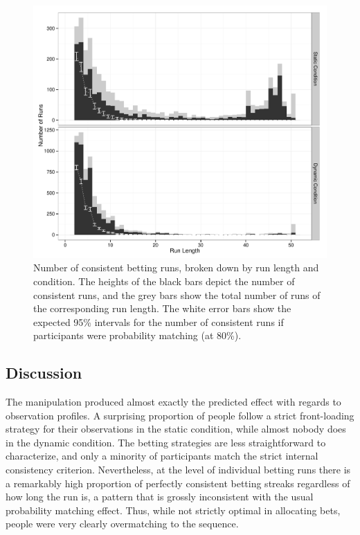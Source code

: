 \documentclass[authoryear]{elsarticle}
\newcommand{\subsectionX}[1]{\subsection{#1}}
\begin{document}
\begin{figure}[t]
\begin{center}
\includegraphics[scale=.6]{overMatching.pdf}
\caption{Number of consistent betting runs, broken down by run length and condition. The heights of the black bars depict the number of consistent runs, and the grey bars show the total number of runs of the corresponding run length. The white error bars show the expected 95\% intervals for the number of consistent runs if participants were probability matching (at 80\%).}
\label{fig:overMatching}
\end{center}
\end{figure}

\subsectionX{Discussion}

The manipulation produced almost exactly the predicted effect with regards to observation profiles. A surprising proportion of people follow a strict front-loading strategy for their observations in the static condition, while almost nobody does in the dynamic condition. The betting strategies are less straightforward to characterize, and only a minority of participants match the strict internal consistency criterion. Nevertheless, at the level of individual betting runs there is a remarkably high proportion of perfectly consistent betting streaks regardless of how long the run is, a pattern that is grossly inconsistent with the usual probability matching effect. Thus, while not strictly optimal in allocating bets, people were very clearly overmatching to the sequence.
\end{document}
